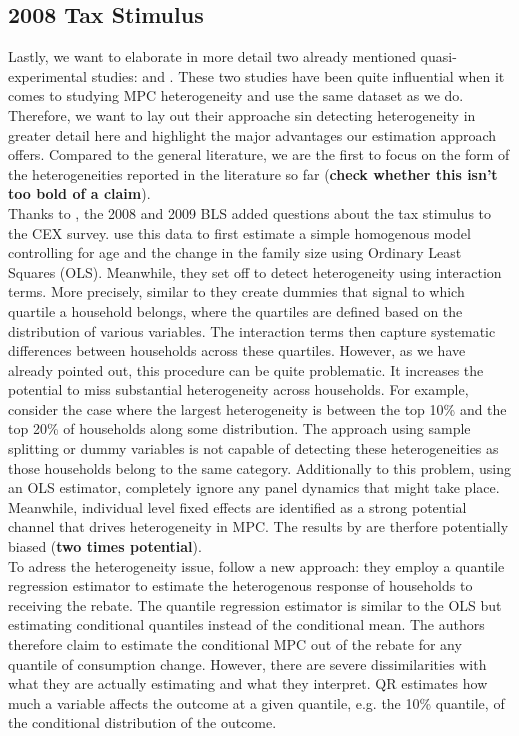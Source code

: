 \subsection{2008 Tax Stimulus}
Lastly, we want to elaborate in more detail two already mentioned quasi-experimental studies: \cite{parker_etal_13} and \cite{ms_14}. These two studies have been quite influential when it comes to studying MPC heterogeneity and use the same dataset as we do. Therefore, we want to lay out their approache sin detecting heterogeneity in greater detail here and highlight the major advantages our estimation approach offers. Compared to the general literature, we are the first to focus on the form of the heterogeneities reported in the literature so far (\textbf{check whether this isn't too bold of a claim}). \\
Thanks to \cite{parker_etal_13}, the 2008 and 2009 BLS added questions about the tax stimulus to the CEX survey. \cite{parker_etal_13} use this data to first estimate a simple homogenous model controlling for age and the change in the family size using Ordinary Least Squares (OLS). Meanwhile, they set off to detect heterogeneity using interaction terms. More precisely, similar to \cite{golosov_etal} they create dummies that signal to which quartile a household belongs, where the quartiles are defined based on the distribution of various variables. The interaction terms then capture systematic differences between households across these quartiles. However, as we have already pointed out, this procedure can be quite problematic. It increases the potential to miss substantial heterogeneity across households. For example, consider the case where the largest heterogeneity is between the top 10\% and the top 20\% of households along some distribution. The approach using sample splitting or dummy variables is not capable of detecting these heterogeneities as those households belong to the same category. Additionally to this problem, using an OLS estimator, \cite{parker_etal_13} completely ignore any panel dynamics that might take place. Meanwhile, individual level fixed effects are identified as a strong potential channel that drives heterogeneity in MPC. The results by \cite{parker_etal_13} are therfore potentially biased (\textbf{two times potential}). \\
To adress the heterogeneity issue, \cite{ms_14} follow a new approach: they employ a quantile regression estimator to estimate the heterogenous response of households to receiving the rebate. The quantile regression estimator is similar to the OLS but estimating conditional quantiles instead of the conditional mean. The authors therefore claim to estimate the conditional MPC out of the rebate for any quantile of consumption change. However, there are severe dissimilarities with what they are actually estimating and what they interpret. QR estimates how much a variable affects the outcome at a given quantile, e.g. the 10\% quantile, of the conditional distribution of the outcome. 